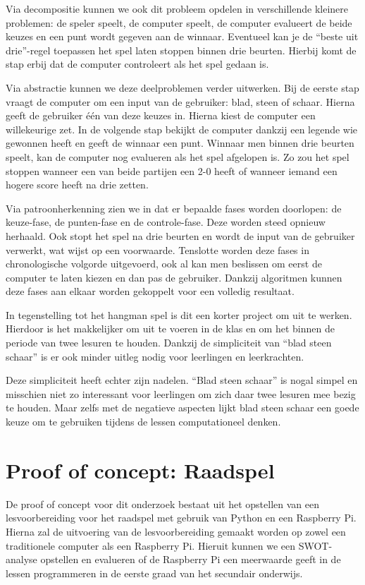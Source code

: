 Via decompositie kunnen we ook dit probleem opdelen in verschillende kleinere problemen: de speler speelt, de computer speelt, de computer evalueert de beide keuzes en een punt wordt gegeven aan de winnaar. Eventueel kan je de “beste uit drie”-regel toepassen het spel laten stoppen binnen drie beurten. Hierbij komt de stap erbij dat de computer controleert als het spel gedaan is.

Via abstractie kunnen we deze deelproblemen verder uitwerken. Bij de eerste stap vraagt de computer om een input van de gebruiker: blad, steen of schaar. Hierna geeft de gebruiker één van deze keuzes in. Hierna kiest de computer een willekeurige zet. In de volgende stap bekijkt de computer dankzij een legende wie gewonnen heeft en geeft de winnaar een punt. Winnaar men binnen drie beurten speelt, kan de computer nog evalueren als het spel afgelopen is. Zo zou het spel stoppen wanneer een van beide partijen een 2-0 heeft of wanneer iemand een hogere score heeft na drie zetten.

Via patroonherkenning zien we in dat er bepaalde fases worden doorlopen: de keuze-fase, de punten-fase en de controle-fase. Deze worden steed opnieuw herhaald. Ook stopt het spel na drie beurten en wordt de input van de gebruiker verwerkt, wat wijst op een voorwaarde. Tenslotte worden deze fases in chronologische volgorde uitgevoerd, ook al kan men beslissen om eerst de computer te laten kiezen en dan pas de gebruiker.
Dankzij algoritmen kunnen deze fases aan elkaar worden gekoppelt voor een volledig resultaat. 

In tegenstelling tot het hangman spel is dit een korter project om uit te werken. Hierdoor is het makkelijker om uit te voeren in de klas en om het binnen de periode van twee lesuren te houden. Dankzij de simpliciteit van “blad steen schaar” is er ook minder uitleg nodig voor leerlingen en leerkrachten.

Deze simpliciteit heeft echter zijn nadelen. “Blad steen schaar” is nogal simpel en misschien niet zo interessant voor leerlingen om zich daar twee lesuren mee bezig te houden. Maar zelfs met de negatieve aspecten lijkt blad steen schaar een goede keuze om te gebruiken tijdens de lessen computationeel denken.

\section{Proof of concept: Raadspel}

De proof of concept voor dit onderzoek bestaat uit het opstellen van een lesvoorbereiding voor het raadspel met gebruik van Python en een Raspberry Pi. Hierna zal de uitvoering van de lesvoorbereiding gemaakt worden op zowel een traditionele computer als een Raspberry Pi. Hieruit kunnen we een SWOT-analyse opstellen en evalueren of de Raspberry Pi een meerwaarde geeft in de lessen programmeren in de eerste graad van het secundair onderwijs.

